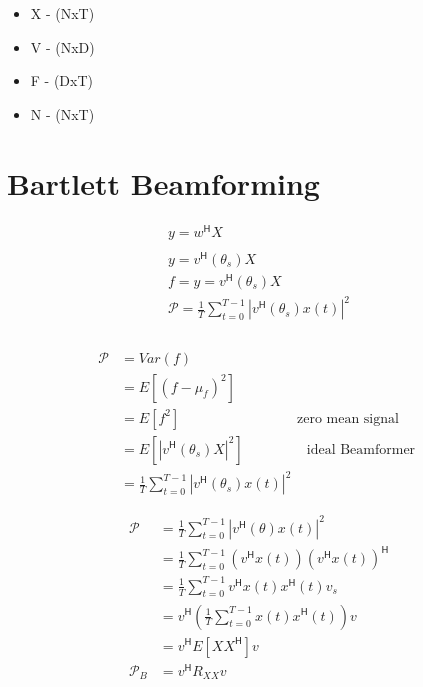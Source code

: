 \documentclass{article}
\begin{document}
\begin{itemize}
	\item X - (NxT) 
	
	\item V - (NxD) 
	
	\item F - (DxT)  \\ 

	\item N - (NxT) 
	
\end{itemize}


\newpage


\section{Bartlett Beamforming}

\begin{align*}
	y = w^\mathsf{H} X
	\\
	\\
	y = v^\mathsf{H}(\theta_s) X
	\\
	f = y = v^\mathsf{H}(\theta_s) X
	\\
	\mathcal{P} = \frac{1}{T} \sum_{t=0}^{T-1} | v^\mathsf{H}(\theta_s) x(t) | ^2
	\\
	\\
\end{align*}


\begin{align*}
	\mathcal{P} &= Var(f)
	\\
	&= E[(f - \mu_f)^2]
	\\
	&= E[f^2] \qquad\qquad\qquad\qquad \text{ zero mean signal }
	\\
	&= E[|v^\mathsf{H}(\theta_s) X|^2] \qquad\qquad\, \text{ ideal Beamformer }
	\\
	&= \frac{1}{T} \sum_{t=0}^{T-1} |v^\mathsf{H}(\theta_s) x(t)|^2
\end{align*}



\begin{align*}
	\mathcal{P} &= \frac{1}{T} \sum_{t=0}^{T-1} | v^\mathsf{H}(\theta) x(t) | ^2
	\\
	&= \frac{1}{T} \sum_{t=0}^{T-1} ( v^\mathsf{H} x(t))(v^\mathsf{H} x(t))^\mathsf{H}
	\\
	&= \frac{1}{T} \sum_{t=0}^{T-1}  v^\mathsf{H} x(t) x^\mathsf{H}(t) v_s
	\\
	&= v^\mathsf{H} \left( \frac{1}{T} \sum_{t=0}^{T-1} x(t) x^\mathsf{H}(t) \right) v 
	\\
	&= v^\mathsf{H} E[X X^\mathsf{H}] v 
	\\
	\mathcal{P}_B &= v^\mathsf{H} R_{XX} v
	\\
\end{align*}
\end{document}
